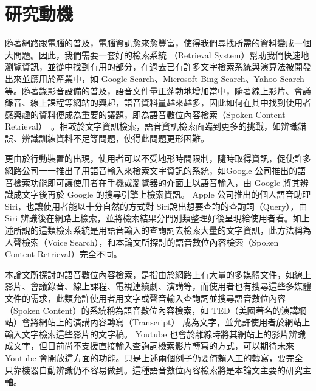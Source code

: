 \section{研究動機}
隨著網路跟電腦的普及，電腦資訊愈來愈豐富，使得我們尋找所需的資料變成一個大問題。因此，我們需要一套好的檢索系統
（Retrieval System）幫助我們快速地瀏覽資訊，並從中找到有用的部分，在過去已有許多文字檢索系統與演算法被開發出來並應用於產業中，如 Google Search、Microsoft Bing Search、Yahoo
Search等。隨著錄影音設備的普及，語音文件量正蓬勃地增加當中，隨著線上影片、會議錄音、線上課程等網站的興起，語音資料量越來越多，因此如何在其中找到使用者感興趣的資料便成為重要的議題，即為語音數位內容檢索（Spoken Content Retrieval）~\cite{chelba2008retrieval, lee2005spoken}。相較於文字資訊檢索，語音資訊檢索面臨到更多的挑戰，如辨識錯誤、辨識訓練資料不足等問題，使得此問題更形困難。

更由於行動裝置的出現，使用者可以不受地形時間限制，隨時取得資訊，促使許多網路公司一一推出了用語音輸入來檢索文字資訊的系統，如Google
公司推出的語音檢索功能即可讓使用者在手機或瀏覽器的介面上以語音輸入，由 Google 將其辨識成文字後再於 Google 的搜尋引擎上檢索資訊。 Apple 公司推出的個人語音助理 Siri，也讓使用者能以十分自然的方式對 Siri說出想要查詢的查詢詞（Query），由 Siri 辨識後在網路上檢索，並將檢索結果分門別類整理好後呈現給使用者看。如上述所說的這類檢索系統是用語音輸入的查詢詞去檢索大量的文字資訊，此方法稱為人聲檢索（Voice
Search），和本論文所探討的語音數位內容檢索（Spoken Content Retrieval）完全不同。

本論文所探討的語音數位內容檢索，是指由於網路上有大量的多媒體文件，如線上影片、會議錄音、線上課程、電視連續劇、演講等，而使用者也有搜尋這些多媒體文件的需求，此類允許使用者用文字或聲音輸入查詢詞並搜尋語音數位內容（Spoken Content）的系統稱為語音數位內容檢索，如 TED（美國著名的演講網站）會將網站上的演講內容轉寫（Transcript） 成為文字，並允許使用者於網站上輸入文字檢索這些影片的文字稿。 Youtube 也會於離線時將其網站上的影片辨識成文字，但目前尚不支援直接輸入查詢詞檢索影片轉寫的方式，可以期待未來 Youtube 會開放這方面的功能。只是上述兩個例子仍要倚賴人工的轉寫，要完全只靠機器自動辨識仍不容易做到。這種語音數位內容檢索將是本論文主要的研究主軸。

